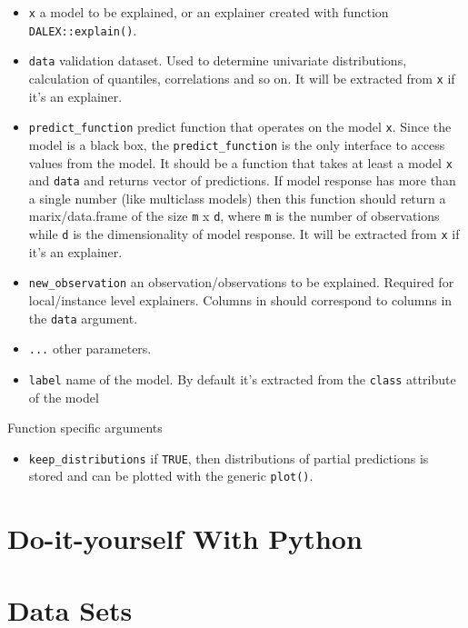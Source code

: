 \documentclass[12pt,]{krantz}
\providecommand{\tightlist}{%
  \setlength{\itemsep}{0pt}\setlength{\parskip}{0pt}}
\theoremstyle{definition}
\theoremstyle{definition}
\theoremstyle{definition}
\theoremstyle{remark}
\begin{document}
\begin{itemize}
\tightlist
\item
  \texttt{x} a model to be explained, or an explainer created with
  function \texttt{DALEX::explain()}.
\item
  \texttt{data} validation dataset. Used to determine univariate
  distributions, calculation of quantiles, correlations and so on. It
  will be extracted from \texttt{x} if it's an explainer.
\item
  \texttt{predict\_function} predict function that operates on the model
  \texttt{x}. Since the model is a black box, the
  \texttt{predict\_function} is the only interface to access values from
  the model. It should be a function that takes at least a model
  \texttt{x} and \texttt{data} and returns vector of predictions. If
  model response has more than a single number (like multiclass models)
  then this function should return a marix/data.frame of the size
  \texttt{m} x \texttt{d}, where \texttt{m} is the number of
  observations while \texttt{d} is the dimensionality of model response.
  It will be extracted from \texttt{x} if it's an explainer.
\item
  \texttt{new\_observation} an observation/observations to be explained.
  Required for local/instance level explainers. Columns in should
  correspond to columns in the \texttt{data} argument.
\item
  \texttt{...} other parameters.
\item
  \texttt{label} name of the model. By default it's extracted from the
  \texttt{class} attribute of the model
\end{itemize}

Function specific arguments

\begin{itemize}
\tightlist
\item
  \texttt{keep\_distributions} if \texttt{TRUE}, then distributions of
  partial predictions is stored and can be plotted with the generic
  \texttt{plot()}.
\end{itemize}

\hypertarget{doItYourselfWithPython}{%
\section{Do-it-yourself With Python}\label{doItYourselfWithPython}}

\hypertarget{dataSetsIntro}{%
\section{Data Sets}\label{dataSetsIntro}}
\end{document}
